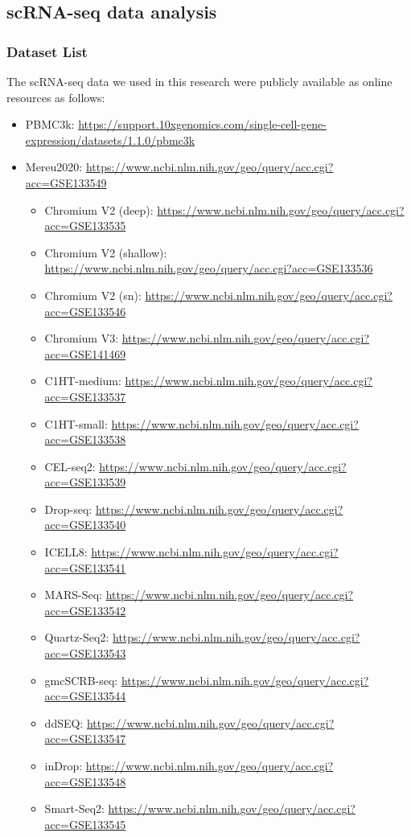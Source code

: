 \documentclass{article}
\begin{document}
\subsection*{scRNA-seq data analysis}
\subsubsection*{Dataset List}
The scRNA-seq data we used in this research were publicly available as online
resources as follows:

\begin{itemize}
  \item PBMC3k: \url{https://support.10xgenomics.com/single-cell-gene-expression/datasets/1.1.0/pbmc3k}
  \item Mereu2020: \url{https://www.ncbi.nlm.nih.gov/geo/query/acc.cgi?acc=GSE133549}
  \begin{itemize}
    \item Chromium V2 (deep): \url{https://www.ncbi.nlm.nih.gov/geo/query/acc.cgi?acc=GSE133535}
    \item Chromium V2 (shallow): \url{https://www.ncbi.nlm.nih.gov/geo/query/acc.cgi?acc=GSE133536}
    \item Chromium V2 (sn): \url{https://www.ncbi.nlm.nih.gov/geo/query/acc.cgi?acc=GSE133546}
    \item Chromium V3: \url{https://www.ncbi.nlm.nih.gov/geo/query/acc.cgi?acc=GSE141469}
    \item C1HT-medium: \url{https://www.ncbi.nlm.nih.gov/geo/query/acc.cgi?acc=GSE133537}
    \item C1HT-small: \url{https://www.ncbi.nlm.nih.gov/geo/query/acc.cgi?acc=GSE133538}
    \item CEL-seq2: \url{https://www.ncbi.nlm.nih.gov/geo/query/acc.cgi?acc=GSE133539}
    \item Drop-seq: \url{https://www.ncbi.nlm.nih.gov/geo/query/acc.cgi?acc=GSE133540}
    \item ICELL8: \url{https://www.ncbi.nlm.nih.gov/geo/query/acc.cgi?acc=GSE133541}
    \item MARS-Seq: \url{https://www.ncbi.nlm.nih.gov/geo/query/acc.cgi?acc=GSE133542}
    \item Quartz-Seq2: \url{https://www.ncbi.nlm.nih.gov/geo/query/acc.cgi?acc=GSE133543}
    \item gmcSCRB-seq: \url{https://www.ncbi.nlm.nih.gov/geo/query/acc.cgi?acc=GSE133544}
    \item ddSEQ: \url{https://www.ncbi.nlm.nih.gov/geo/query/acc.cgi?acc=GSE133547}
    \item inDrop: \url{https://www.ncbi.nlm.nih.gov/geo/query/acc.cgi?acc=GSE133548}
    \item Smart-Seq2: \url{https://www.ncbi.nlm.nih.gov/geo/query/acc.cgi?acc=GSE133545}
  \end{itemize}
\end{itemize}
\end{document}
